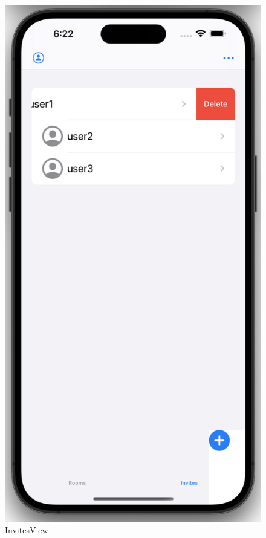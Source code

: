     \begin{figure}[h]
        \includegraphics[scale=0.5]{invites}
        \centering
        \caption{InvitesView}\label{fig:invitesview}
    \end{figure}

